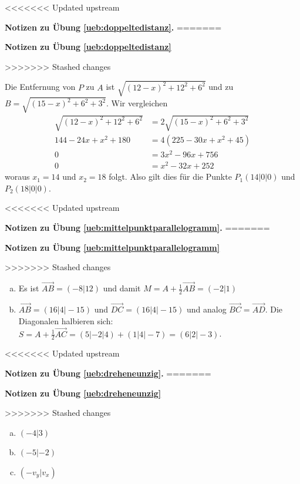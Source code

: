 \documentclass[%
11pt,%
twoside,%
titlepage,%
<<<<<<< Updated upstream
german,%
=======
swissgerman,%
>>>>>>> Stashed changes
headsepline%
]{scrartcl}
\newcommand{\faReturnGray}{\textcolor{gray}{\faMailReply}} %
\theoremstyle{definition}
\theoremstyle{plain}
\newcommand{\concatueb}[1]{ueb:#1}%
\newcommand{\concatlsg}[1]{lsg:#1}%
\newenvironment{lsg}[1]{%
<<<<<<< Updated upstream
    \par\noindent\textbf{Notizen zu Übung \ref{\concatueb{#1}}.}%
    \label{\concatlsg{#1}}
=======
    \par\noindent\textbf{Notizen zu Übung \ref{\concatueb{#1}}}\label{\concatlsg{#1}}
    \hfill\hyperref[\concatueb{#1}]{\faReturnGray}\par %
>>>>>>> Stashed changes
}{%
    \par%
}
\begin{document}
\begin{lsg}{doppeltedistanz}
    Die Entfernung von $P$ zu $A$ ist $\sqrt{(12-x)^2+12^2+6^2}$ und zu $B=\sqrt{(15-x)^2+6^2+3^2}$. Wir vergleichen
    \begin{align*}
        \sqrt{(12-x)^2+12^2+6^2} &= 2\sqrt{(15-x)^2+6^2+3^2}\\
        144-24x+x^2+180 &= 4(225-30x+x^2+45)\\
        0 &= 3x^2-96x+756\\
        0 &= x^2-32x+252
    \end{align*}
    woraus $x_1=14$ und $x_2=18$ folgt. Also gilt dies für die Punkte $P_1(14|0|0)$ und $P_2(18|0|0)$.
\end{lsg}
\begin{lsg}{mittelpunktparallelogramm}
    \begin{enumerate}[a)]
        \item Es ist $\vec{AB}=(-8|12)$ und damit $M=A+\frac{1}{2}\vec{AB}=(-2|1)$
        \item $\vec{AB}=(16|4|-15)$ und $\vec{DC}=(16|4|-15)$ und analog $\vec{BC}=\vec{AD}$.
        Die Diagonalen halbieren sich: $S=A+\frac{1}{2}\vec{AC}=(5|-2|4)+(1|4|-7)=(6|2|-3)$.
    \end{enumerate}
\end{lsg}
\begin{lsg}{dreheneunzig}
    \begin{enumerate}[a)]
        \item $(-4|3)$
        \item $(-5|-2)$
        \item $(-v_y|v_x)$
    \end{enumerate}
\end{lsg}
\end{document}
